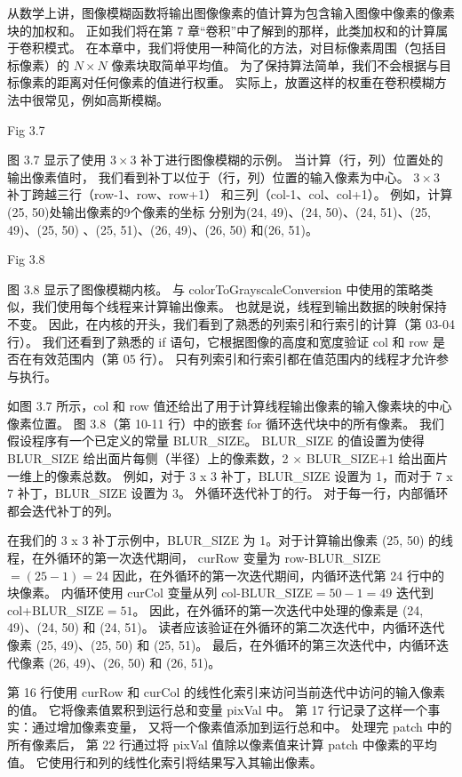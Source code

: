 从数学上讲，图像模糊函数将输出图像像素的值计算为包含输入图像中像素的像素块的加权和。 
正如我们将在第 7 章“卷积”中了解到的那样，此类加权和的计算属于卷积模式。 
在本章中，我们将使用一种简化的方法，对目标像素周围（包括目标像素）的 $N \times N$ 像素块取简单平均值。 
为了保持算法简单，我们不会根据与目标像素的距离对任何像素的值进行权重。 
实际上，放置这样的权重在卷积模糊方法中很常见，例如高斯模糊。

{\color{red} Fig 3.7}

图 3.7 显示了使用 $3 \times 3$ 补丁进行图像模糊的示例。 当计算（行，列）位置处的输出像素值时，
我们看到补丁以位于（行，列）位置的输入像素为中心。 $3 \times 3$ 补丁跨越三行（row-1、row、row+1）
和三列（col-1、col、col+1）。 例如，计算(25, 50)处输出像素的9个像素的坐标
分别为(24, 49)、(24, 50)、(24, 51)、(25, 49)、(25, 50) 、(25, 51)、(26, 49)、(26, 50) 和(26, 51)。

{\color{red} Fig 3.8}

图 3.8 显示了图像模糊内核。 与 colorToGrayscaleConversion 中使用的策略类似，我们使用每个线程来计算输出像素。 
也就是说，线程到输出数据的映射保持不变。 因此，在内核的开头，我们看到了熟悉的列索引和行索引的计算（第 03-04 行）。 
我们还看到了熟悉的 if 语句，它根据图像的高度和宽度验证 col 和 row 是否在有效范围内（第 05 行）。 
只有列索引和行索引都在值范围内的线程才允许参与执行。

如图 3.7 所示，col 和 row 值还给出了用于计算线程输出像素的输入像素块的中心像素位置。 
图 3.8（第 10-11 行）中的嵌套 for 循环迭代块中的所有像素。 我们假设程序有一个已定义的常量 BLUR\_SIZE。 
BLUR\_SIZE 的值设置为使得 BLUR\_SIZE 给出面片每侧（半径）上的像素数，2 × BLUR\_SIZE+1 给出面片一维上的像素总数。 
例如，对于 3 x 3 补丁，BLUR\_SIZE 设置为 1，而对于 7 x 7 补丁，BLUR\_SIZE 设置为 3。
外循环迭代补丁的行。 对于每一行，内部循环都会迭代补丁的列。

在我们的 3 x 3 补丁示例中，BLUR\_SIZE 为 1。对于计算输出像素 (25, 50) 的线程，在外循环的第一次迭代期间，
curRow 变量为 row-BLUR\_SIZE$ = (25 - 1) = 24$ 因此，在外循环的第一次迭代期间，内循环迭代第 24 行中的块像素。
内循环使用 curCol 变量从列 col-BLUR\_SIZE$ = 50 - 1 = 49$ 迭代到 col+BLUR\_SIZE$ = 51$。 
因此，在外循环的第一次迭代中处理的像素是 (24, 49)、(24, 50) 和 (24, 51)。 
读者应该验证在外循环的第二次迭代中，内循环迭代像素 (25, 49)、(25, 50) 和 (25, 51)。 
最后，在外循环的第三次迭代中，内循环迭代像素 (26, 49)、(26, 50) 和 (26, 51)。

第 16 行使用 curRow 和 curCol 的线性化索引来访问当前迭代中访问的输入像素的值。 
它将像素值累积到运行总和变量 pixVal 中。 第 17 行记录了这样一个事实：通过增加像素变量，
又将一个像素值添加到运行总和中。 处理完 patch 中的所有像素后，
第 22 行通过将 pixVal 值除以像素值来计算 patch 中像素的平均值。 它使用行和列的线性化索引将结果写入其输出像素。

